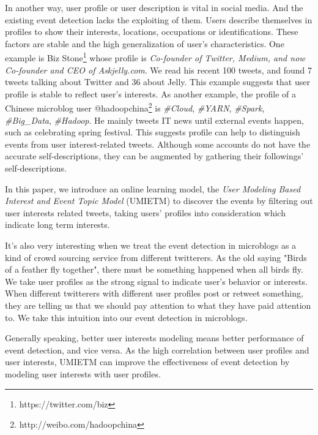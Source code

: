 \documentclass{llncs}
\begin{document}
In another way, user profile or user description is vital in social media. 
And the existing event detection lacks the exploiting of them.
Users describe themselves in profiles to show their interests, locations, occupations or identifications.
These factors are stable and the high generalization of user's characteristics.
One example is Biz Stone\footnote{https://twitter.com/biz} whose profile is \textit{Co-founder of Twitter, Medium, and now Co-founder and CEO of Askjelly.com}. We read his recent 100 tweets, and found 7 tweets talking about Twitter and 36 about Jelly.
This example suggests that user profile is stable to reflect user's interests.
As another example, the profile of a Chinese microblog user @hadoopchina\footnote{http://weibo.com/hadoopchina} is \textit{\#Cloud}, \textit{\#YARN}, \textit{\#Spark}, \textit{\#Big\_Data}, \textit{\#Hadoop}. He mainly tweets IT news until external events happen,  such as celebrating spring festival.
This suggests profile can help to distinguish events from user interest-related tweets.
Although some accounts do not have the accurate self-descriptions, they can be augmented by gathering their followings' self-descriptions.

In this paper, we introduce an online learning model, the \textit{User Modeling Based Interest and Event Topic Model} (UMIETM) to discover the events by filtering out user interests related tweets, taking users' profiles into consideration which indicate long term interests.

It's also very interesting when we treat the event detection in microblogs as a kind of crowd sourcing service from different twitterers.
As the old saying "Birds of a feather fly together", there must be something happened when all birds fly. 
We take user profiles as the strong signal to indicate user's behavior or interests.
When different twitterers with different user profiles post or retweet something, they are telling us that we should pay attention to what they have paid attention to.
We take this intuition into our event detection in microblogs.

Generally speaking, better user interests modeling means better performance of event detection, and vice versa.
As the high correlation between user profiles and user interests, UMIETM can improve the effectiveness of event detection by modeling user interests with user profiles.
 
\end{document}
